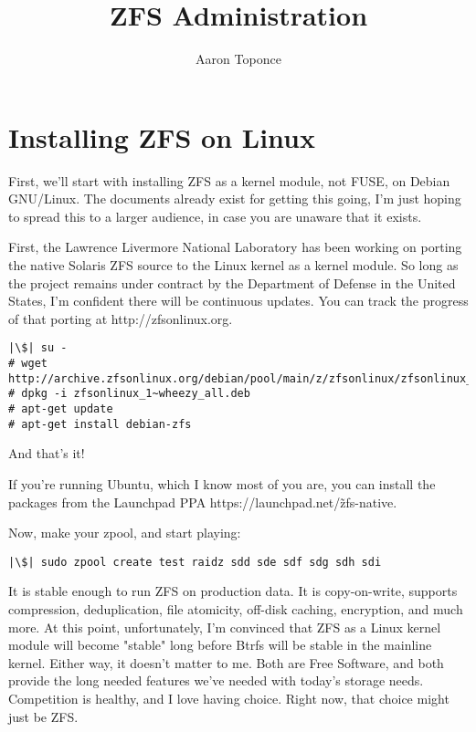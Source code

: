 \documentclass{book}
\begin{document}
\begin{titlepage}
\title{ZFS Administration}
\author{Aaron Toponce}
\maketitle
\end{titlepage}

\chapter{Installing ZFS on Linux}
First, we'll start with installing ZFS as a kernel module, not FUSE, on
Debian GNU/Linux. The documents already exist for getting this going, I'm
just hoping to spread this to a larger audience, in case you are unaware
that it exists.

First, the Lawrence Livermore National Laboratory has been working on
porting the native Solaris ZFS source to the Linux kernel as a kernel
module. So long as the project remains under contract by the Department of
Defense in the United States, I'm confident there will be continuous
updates. You can track the progress of that porting at
http://zfsonlinux.org.

\begin{lstlisting}
|\$| su -
# wget http://archive.zfsonlinux.org/debian/pool/main/z/zfsonlinux/zfsonlinux_1%7Ewheezy_all.deb
# dpkg -i zfsonlinux_1~wheezy_all.deb
# apt-get update
# apt-get install debian-zfs
\end{lstlisting}

And that's it!

If you're running Ubuntu, which I know most of you are, you can install the
packages from the Launchpad PPA https://launchpad.net/\~zfs-native.

Now, make your zpool, and start playing:

\begin{lstlisting}
|\$| sudo zpool create test raidz sdd sde sdf sdg sdh sdi
\end{lstlisting}

It is stable enough to run ZFS on production data. It is copy-on-write,
supports compression, deduplication, file atomicity, off-disk caching,
encryption, and much more. At this point, unfortunately, I'm convinced that
ZFS as a Linux kernel module will become "stable" long before Btrfs will be
stable in the mainline kernel. Either way, it doesn't matter to me. Both
are Free Software, and both provide the long needed features we've needed
with today's storage needs. Competition is healthy, and I love having
choice. Right now, that choice might just be ZFS.
\end{document}

